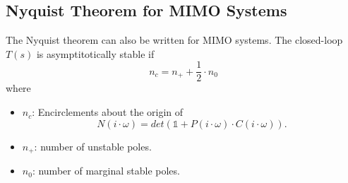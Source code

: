 \documentclass[a4paper,12 pt]{article}
\numberwithin{equation}{section}
\theoremstyle{definition}
\theoremstyle{remark}
\theoremstyle{definition}
\theoremstyle{definition}
\theoremstyle{definition}
\theoremstyle{remark}
\begin{document}
\subsection{Nyquist Theorem for MIMO Systems}
The Nyquist theorem can also be written for MIMO systems. The closed-loop $T(s)$ is asymptitotically stable if
\begin{equation}
n_c=n_++\frac{1}{2}\cdot n_0
\end{equation}
where
\begin{itemize}
\item $n_c$: Encirclements about the origin of
\begin{equation}
N(i\cdot \omega)=det(\mathbb{1}+P(i\cdot \omega )\cdot C(i\cdot \omega)).
\end{equation}
\item $n_+$: number of unstable poles.
\item $n_0$: number of marginal stable poles.
\end{itemize}
\end{document}
